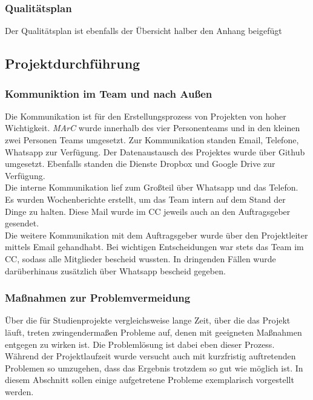 \subsubsection{Qualitätsplan}
Der Qualitätsplan ist ebenfalls der Übersicht halber den Anhang beigefügt

\subsection{Projektdurchführung}
\subsubsection{Kommuniktion im Team und nach Außen}
Die Kommunikation ist für den Erstellungsprozess von Projekten von hoher Wichtigkeit.\textit{ MArC} wurde innerhalb des vier Personenteams und in den kleinen zwei Personen Teams umgesetzt. Zur Kommunikation standen Email, Telefone, Whatsapp zur Verfügung. Der Datenaustausch des Projektes wurde über Github umgesetzt. Ebenfalls standen die Dienste Dropbox und Google Drive zur Verfügung.\\
Die interne Kommunikation lief zum Großteil über Whatsapp und das Telefon. Es wurden Wochenberichte erstellt, um das Team intern auf dem Stand der Dinge zu halten. Diese Mail wurde im CC jeweils auch an den Auftragsgeber gesendet.\\
Die weitere Kommunikation mit dem Auftragsgeber wurde über den Projektleiter mittels Email gehandhabt. Bei wichtigen Entscheidungen war stets das Team im CC, sodass alle Mitglieder bescheid wussten. In dringenden Fällen wurde darüberhinaus zusätzlich über Whatsapp bescheid gegeben.

\subsubsection{Maßnahmen zur Problemvermeidung}
Über die für Studienprojekte vergleichsweise lange Zeit, über die das Projekt läuft, treten zwingendermaßen Probleme auf, denen mit geeigneten Maßnahmen entgegen zu wirken ist. Die Problemlösung ist dabei eben dieser Prozess. Während der Projektlaufzeit wurde versucht auch mit kurzfristig auftretenden Problemen so umzugehen, dass das Ergebnis trotzdem so gut wie möglich ist. In diesem Abschnitt sollen einige aufgetretene Probleme exemplarisch vorgestellt werden.


